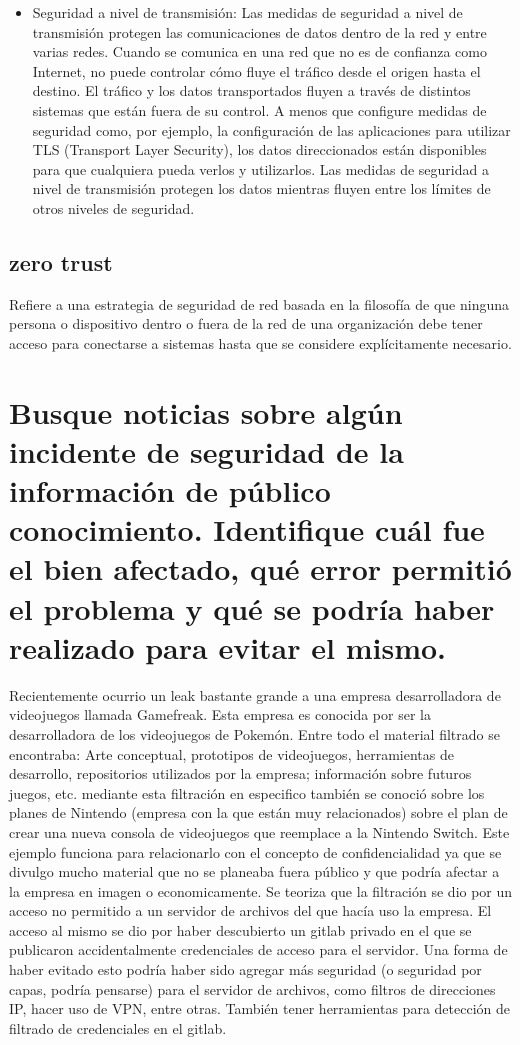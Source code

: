 \documentclass{article}
\begin{document}
\begin{itemize}
				\item Seguridad a nivel de transmisión: Las medidas de seguridad a nivel de transmisión protegen las comunicaciones de datos dentro de la red y entre varias redes. Cuando se comunica en una red que no es de confianza como Internet, no puede controlar cómo fluye el tráfico desde el origen hasta el destino. El tráfico y los datos transportados fluyen a través de distintos sistemas que están fuera de su control. A menos que configure medidas de seguridad como, por ejemplo, la configuración de las aplicaciones para utilizar TLS (Transport Layer Security), los datos direccionados están disponibles para que cualquiera pueda verlos y utilizarlos. Las medidas de seguridad a nivel de transmisión protegen los datos mientras fluyen entre los límites de otros niveles de seguridad.
				
			\end{itemize}
		\subsection{zero trust}
			Refiere a una estrategia de seguridad de red basada en la filosofía de que ninguna persona o dispositivo dentro o fuera de la red de una organización debe tener acceso para conectarse a sistemas hasta que se considere explícitamente necesario. 
	\section{Busque noticias sobre algún incidente de seguridad de la información de público conocimiento. Identifique cuál fue el bien afectado, qué error permitió el problema y qué se podría haber realizado para evitar el mismo.}
	Recientemente ocurrio un leak bastante grande a una empresa desarrolladora de videojuegos llamada Gamefreak.
	Esta empresa es conocida por ser la desarrolladora de los videojuegos de Pokemón. Entre todo el material filtrado se encontraba: Arte conceptual, prototipos de videojuegos, herramientas de desarrollo, repositorios utilizados por la empresa; información sobre futuros juegos, etc. mediante esta filtración en especifico también se conoció sobre los planes de Nintendo (empresa con la que están muy relacionados) sobre el plan de crear una nueva consola de videojuegos que reemplace a la Nintendo Switch.
	Este ejemplo funciona para relacionarlo con el concepto de confidencialidad ya que se divulgo mucho material que no se planeaba fuera público y que podría afectar a la empresa en imagen o economicamente.
	Se teoriza que la filtración se dio por un acceso no permitido a un servidor de archivos del que hacía uso la empresa. El acceso al mismo se dio por haber descubierto un gitlab privado en el que se publicaron accidentalmente credenciales de acceso para el servidor.
	Una forma de haber evitado esto podría haber sido agregar más seguridad (o seguridad por capas, podría pensarse) para el servidor de archivos, como filtros de direcciones IP, hacer uso de VPN, entre otras. 
	También tener herramientas para detección de filtrado de credenciales en el gitlab.
	
\end{document}

